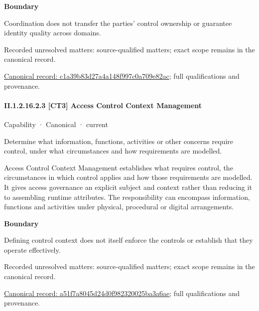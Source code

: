 \textbf{Boundary}



Coordination does not transfer the parties' control ownership or guarantee identity quality across domains.


{\small Recorded unresolved matters: source-qualified matters; exact scope remains in the canonical record.}\par
{\footnotesize \href{../../../../continuum/strategy/capability/c1a39b83d27a4a148f997c0a709e82ac.md}{Canonical record: c1a39b83d27a4a148f997c0a709e82ac}; full qualifications and provenance.}\par
\paragraph*{II.1.2.16.2.3 [CT3] Access Control Context Management}
\label{navigation:II.1.2.16.2.3}

\label{element:a51f7a8045d24d0f982320025ba3a6ae}
{\small Capability · Canonical · current}\par

Determine what information, functions, activities or other concerns require control, under what circumstances and how requirements are modelled.



Access Control Context Management establishes what requires control, the circumstances in which control applies and how those requirements are modelled. It gives access governance an explicit subject and context rather than reducing it to assembling runtime attributes. The responsibility can encompass information, functions and activities under physical, procedural or digital arrangements.



\textbf{Boundary}



Defining control context does not itself enforce the controls or establish that they operate effectively.


{\small Recorded unresolved matters: source-qualified matters; exact scope remains in the canonical record.}\par
{\footnotesize \href{../../../../continuum/strategy/capability/a51f7a8045d24d0f982320025ba3a6ae.md}{Canonical record: a51f7a8045d24d0f982320025ba3a6ae}; full qualifications and provenance.}\par

